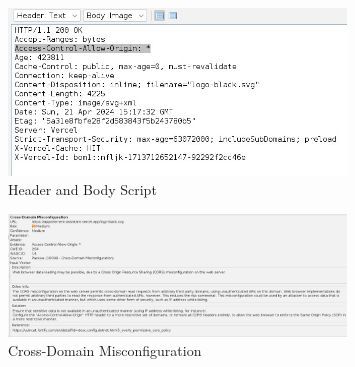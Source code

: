 \documentclass[openany]{report}
\begin{document}
\begin{enumerate}
          \begin{figure}[H]
              \centering
              \includegraphics[width=0.8\textwidth]{imgs/3.jpg}
              \caption{ Header and Body Script}
              \label{fig:my_label5}
          \end{figure}
          \begin{figure}[H]
              \centering
              \includegraphics[width=0.8\textwidth]{imgs/Medium2.jpg}
              \caption{Cross-Domain Misconfiguration}
              \label{fig:my_label7}
          \end{figure}
\end{enumerate}
\end{document}
